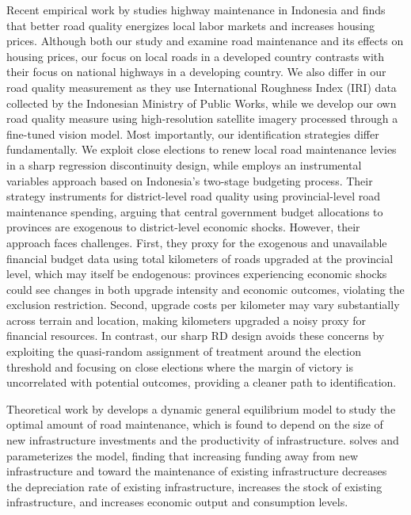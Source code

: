 Recent empirical work by \cite{gertler2024road} studies highway maintenance in Indonesia and finds that better road quality energizes local labor markets and increases housing prices. Although both our study and \cite{gertler2024road} examine road maintenance and its effects on housing prices, our focus on local roads in a developed country contrasts with their focus on national highways in a developing country. We also differ in our road quality measurement as they use International Roughness Index (IRI) data collected by the Indonesian Ministry of Public Works, while we develop our own road quality measure using high-resolution satellite imagery processed through a fine-tuned vision model. Most importantly, our identification strategies differ fundamentally. We exploit close elections to renew local road maintenance levies in a sharp regression discontinuity design, while \cite{gertler2024road} employs an instrumental variables approach based on Indonesia's two-stage budgeting process. Their strategy instruments for district-level road quality using provincial-level road maintenance spending, arguing that central government budget allocations to provinces are exogenous to district-level economic shocks. However, their approach faces challenges. First, they proxy for the exogenous and unavailable financial budget data using total kilometers of roads upgraded at the provincial level, which may itself be endogenous: provinces experiencing economic shocks could see changes in both upgrade intensity and economic outcomes, violating the exclusion restriction. Second, upgrade costs per kilometer may vary substantially across terrain and location, making kilometers upgraded a noisy proxy for financial resources. In contrast, our sharp RD design avoids these concerns by exploiting the quasi-random assignment of treatment around the election threshold and focusing on close elections where the margin of victory is uncorrelated with potential outcomes, providing a cleaner path to identification.



Theoretical work by \cite{rioja2003} develops a dynamic general equilibrium model to study the optimal amount of road maintenance, which is found to depend on the size of new infrastructure investments and the productivity of infrastructure. \cite{rioja2003} solves and parameterizes the model, finding that increasing funding away from new infrastructure and toward the maintenance of existing infrastructure decreases the depreciation rate of existing infrastructure, increases the stock of existing infrastructure, and increases economic output and consumption levels. 
   
